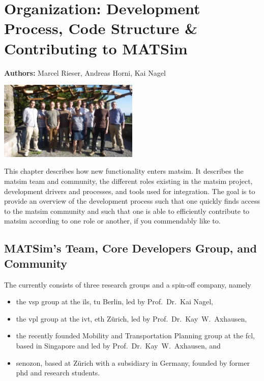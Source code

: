 \chapter{Organization: Development Process, Code Structure \& Contributing to MATSim}
\label{ch:developmentprocess}


\hfill \textbf{Authors:} Marcel Rieser, Andreas Horni, Kai Nagel

\begin{center} \includegraphics[width=0.5\textwidth, angle=0]{extending/figures/ConceptualMeetingVillaHatt.jpg} \end{center}

This chapter describes how new functionality enters \gls{matsim}. It describes the \gls{matsim} team and community, the different roles existing in the \gls{matsim} project, development drivers and processes, and tools used for integration. The goal is to 
provide an overview of the development process such that 
one quickly finds access to the \gls{matsim} community and such that 
one is able to efficiently contribute to \gls{matsim} according to one role or another, if you commendably like to.

\section{MATSim's Team, Core Developers Group, and Community}
The  
currently consists of three research groups and a spin-off company, namely 
\begin{itemize}\styleItemize
\item the \gls{vsp} group at the \gls{ils}, \gls{tu} Berlin, led by Prof.~Dr.~Kai Nagel,
\item the \gls{vpl} group at the \gls{ivt}, \gls{eth} Zürich, led by Prof.~Dr.~Kay~W.~Axhausen, 
\item the recently founded Mobility and Transportation Planning group at the \gls{fcl}, based in Singapore and led by Prof.~Dr.~Kay~W.~Axhausen, and 
\item \gls{senozon}, based at Zürich with a subsidiary in Germany, founded by former \acrshort{phd} and research students. 
\end{itemize}

